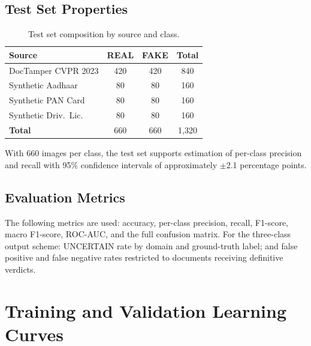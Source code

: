 \documentclass[12pt,a4paper,oneside]{report}
\begin{document}
\subsection{Test Set Properties}

\begin{table}[H]
\centering
\caption{Test set composition by source and class.}
\label{tab:test_set}
\renewcommand{\arraystretch}{1.3}
\begin{tabular}{lccc}
\toprule
\textbf{Source} & \textbf{REAL} & \textbf{FAKE} & \textbf{Total} \\
\midrule
DocTamper CVPR 2023  & 420  & 420  & 840  \\
Synthetic Aadhaar    & 80   & 80   & 160  \\
Synthetic PAN Card   & 80   & 80   & 160  \\
Synthetic Driv.\ Lic.& 80   & 80   & 160  \\
\midrule
\textbf{Total}       & 660  & 660  & 1,320 \\
\bottomrule
\end{tabular}
\end{table}

With 660 images per class, the test set supports estimation of per-class
precision and recall with 95\% confidence intervals of approximately
$\pm$2.1 percentage points.

\subsection{Evaluation Metrics}

The following metrics are used: accuracy, per-class precision, recall, F1-score,
macro F1-score, ROC-AUC, and the full confusion matrix. For the three-class
output scheme: UNCERTAIN rate by domain and ground-truth label; and false
positive and false negative rates restricted to documents receiving definitive
verdicts.

\section{Training and Validation Learning Curves}
\label{sec:curves}
\end{document}
